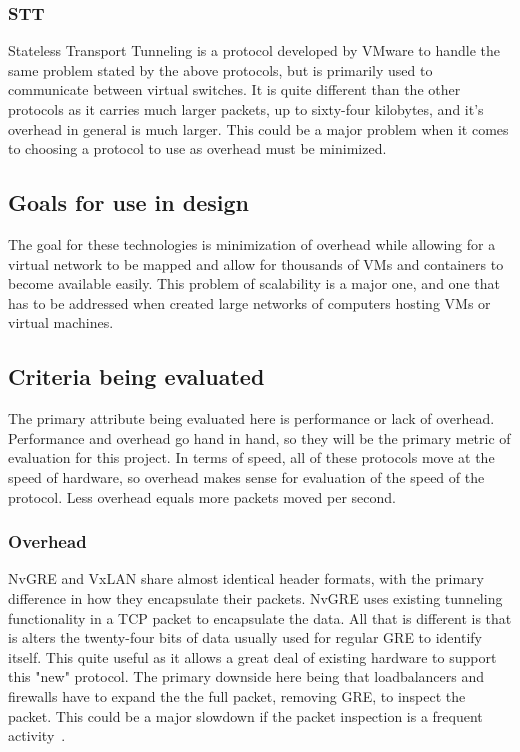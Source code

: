 \documentclass[10pt,letterpaper,onecolumn,journal]{IEEEtran}
\begin{document}
\subsubsection{STT}
Stateless Transport Tunneling is a protocol developed by VMware to handle the
same problem stated by the above protocols, but is primarily used to communicate
between virtual switches. It is quite different than the other protocols as it
carries much larger packets, up to sixty-four kilobytes, and it's overhead in
general is much larger. This could be a major problem when it comes to choosing
a protocol to use as overhead must be minimized.

\subsection{Goals for use in design}
The goal for these technologies is minimization of overhead while allowing for a
virtual network to be mapped and allow for thousands of VMs and containers to
become available easily. This problem of scalability is a major one, and one
that has to be addressed when created large networks of computers hosting VMs or
virtual machines.

\subsection{Criteria being evaluated}
The primary attribute being evaluated here is performance or lack of overhead.
Performance and overhead go hand in hand, so they will be the primary metric of
evaluation for this project. In terms of speed, all of these protocols move at
the speed of hardware, so overhead makes sense for evaluation of the speed of
the protocol. Less overhead equals more packets moved per second.

\subsubsection{Overhead}
NvGRE and VxLAN share almost identical header formats, with the primary
difference in how they encapsulate their packets. NvGRE uses existing tunneling
functionality in a TCP packet to encapsulate the data. All that is different is
that is alters the twenty-four bits of data usually used for regular GRE to
identify itself. This quite useful as it allows a great deal of existing
hardware to support this "new" protocol. The primary downside here being that
loadbalancers and firewalls have to expand the the full packet, removing GRE, to
inspect the packet. This could be a major slowdown if the packet inspection is a
frequent activity~\cite{nvgre-vs-vxlan}.
\end{document}
